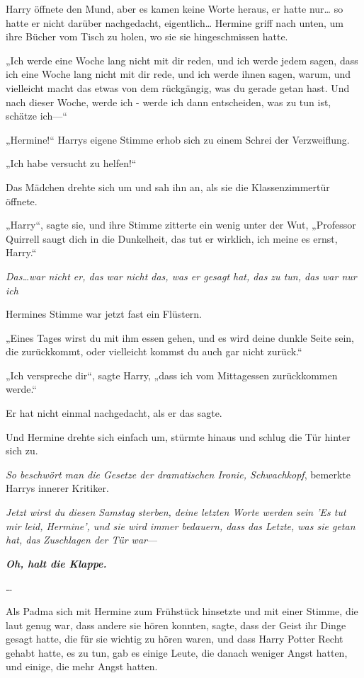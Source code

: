 {Harry öffnete den Mund, aber es kamen keine Worte heraus, er hatte nur… so hatte er nicht darüber nachgedacht, eigentlich… Hermine griff nach unten, um ihre Bücher vom Tisch zu holen, wo sie sie hingeschmissen hatte.

„Ich werde eine Woche lang nicht mit dir reden, und ich werde jedem sagen, dass ich eine Woche lang nicht mit dir rede, und ich werde ihnen sagen, warum, und vielleicht macht das etwas von dem rückgängig, was du gerade getan hast. Und nach dieser Woche, werde ich - werde ich dann entscheiden, was zu tun ist, schätze ich—“

„Hermine!“ Harrys eigene Stimme erhob sich zu einem Schrei der Verzweiflung.

„Ich habe versucht zu helfen!“

Das Mädchen drehte sich um und sah ihn an, als sie die Klassenzimmertür öffnete.

„Harry“, sagte sie, und ihre Stimme zitterte ein wenig unter der Wut, „Professor Quirrell saugt dich in die Dunkelheit, das tut er wirklich, ich meine es ernst, Harry.“

\emph{Das…war nicht er, das war nicht das, was er gesagt hat, das zu tun, das war nur ich}

Hermines Stimme war jetzt fast ein Flüstern.

„Eines Tages wirst du mit ihm essen gehen, und es wird deine dunkle Seite sein, die zurückkommt, oder vielleicht kommst du auch gar nicht zurück.“

„Ich verspreche dir“, sagte Harry, „dass ich vom Mittagessen zurückkommen werde.“

Er hat nicht einmal nachgedacht, als er das sagte.

Und Hermine drehte sich einfach um, stürmte hinaus und schlug die Tür hinter sich zu.

\emph{So beschwört man die Gesetze der dramatischen Ironie, Schwachkopf}, bemerkte Harrys innerer Kritiker.

\emph{Jetzt wirst du diesen Samstag sterben, deine letzten Worte werden sein 'Es tut mir leid, Hermine', und sie wird immer bedauern, dass das Letzte, was sie getan hat, das} \emph{Zuschlagen der Tür war}—

\textbf{\emph{Oh, halt die Klappe.}}

…

Als Padma sich mit Hermine zum Frühstück hinsetzte und mit einer Stimme, die laut genug war, dass andere sie hören konnten, sagte, dass der Geist ihr Dinge gesagt hatte, die für sie wichtig zu hören waren, und dass Harry Potter Recht gehabt hatte, es zu tun, gab es einige Leute, die danach weniger Angst hatten, und einige, die mehr Angst hatten.

}
